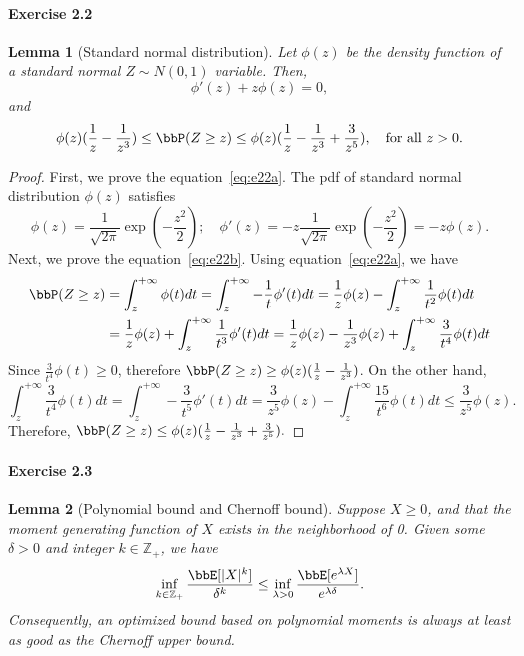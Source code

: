 \documentclass[11pt]{article}
\theoremstyle{plain}
\newtheorem{lem}{Lemma}
\theoremstyle{definition}
\begin{document}
\paragraph{Exercise 2.2}
\begin{lem}[Standard normal distribution]\label{lem:n01}
	Let $\phi(z)$ be the density function of a standard normal $Z \sim N(0,1)$ variable. Then, 
	\begin{equation}\label{eq:e22a}
		\phi'(z) + z \phi(z) = 0,
	\end{equation}
	and \begin{equation}\label{eq:e22b}
		\phi(z)(\frac{1}{z} - \frac{1}{z^3} ) \leq \bbP(Z \geq z) \leq \phi(z)(\frac{1}{z} - \frac{1}{z^3}+ \frac{3}{z^5} ), \quad \text{for all }z>0.
	\end{equation}
\end{lem}
\begin{proof}First, we prove the equation~\eqref{eq:e22a}. The pdf of standard normal distribution $\phi(z)$ satisfies
\[  \phi(z) = \frac{1}{\sqrt{2\pi}} \exp(-\frac{z^2}{2}  ); \quad \phi'(z) = -z \frac{1}{\sqrt{2\pi}} \exp(-\frac{z^2}{2} ) = -z \phi(z). \]
	Next, we prove the equation~\eqref{eq:e22b}. Using equation~\eqref{eq:e22a}, we have
	\begin{align}
		\bbP(Z \geq z) &= \int_{z}^{+\infty} \phi(t) dt = \int_{z}^{+\infty} - \frac{1}{t} \phi'(t) dt = \frac{1}{z} \phi(z) - \int_{z}^{+\infty} \frac{1}{t^2} \phi(t) dt\\
		&= \frac{1}{z} \phi(z) + \int_{z}^{+\infty} \frac{1}{t^3} \phi'(t) dt =  \frac{1}{z} \phi(z) - \frac{1}{z^3} \phi(z) + \int_{z}^{+\infty} \frac{3}{t^4} \phi(t) dt
	\end{align}
	Since $\frac{3}{t^4} \phi(t) \geq 0$, therefore $\bbP(Z \geq z) \geq \phi(z)(\frac{1}{z}  - \frac{1}{z^3} )$. On the other hand, 
	\[ \int_{z}^{+\infty} \frac{3}{t^4} \phi(t) dt = \int_{z}^{+\infty} - \frac{3}{t^5} \phi'(t) dt =\frac{3}{ z^5} \phi(z) -  \int_{z}^{+\infty} \frac{15}{t^6} \phi(t) dt \leq \frac{3}{ z^5} \phi(z). \]
	Therefore, $\bbP(Z \geq z) \leq \phi(z)(\frac{1}{z}  - \frac{1}{z^3} + \frac{3}{z^5} ).$
\end{proof}

\paragraph{Exercise 2.3}

\begin{lem}[Polynomial bound and Chernoff bound]\label{lem:momcher}
	Suppose $X \geq 0$, and that the moment generating function of $X$ exists in the neighborhood of 0. Given some $\delta > 0$ and integer $ k \in \mathbb{Z_+}$, we have
	\[  \inf_{k \in \mathbb{Z_+} } \frac{\bbE[|X|^k]}{\delta^k} \leq \inf_{\lambda >0} \frac{\bbE[e^{\lambda X}]}{e^{\lambda \delta}}. \]
	Consequently, an optimized bound based on polynomial moments is always at least as good as the Chernoff upper bound.
\end{lem}
\end{document}

